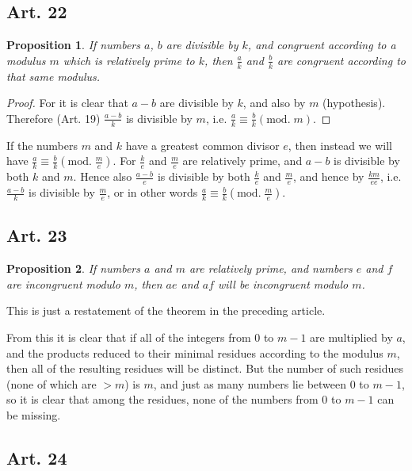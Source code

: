 \documentclass{book}
\theoremstyle{plain}
\newtheorem{proposition}{Proposition}
\theoremstyle{remark}
\begin{document}
\subsection*{Art. 22} 

\begin{proposition} If numbers $a$, $b$ are divisible by $k$, and congruent according to a modulus $m$ which is relatively prime to $k$, then $\frac{a}{k}$ and $\frac{b}{k}$ are congruent according to that same modulus.\end{proposition}
\begin{proof} For it is clear that $a-b$ are divisible by $k$, and also by $m$ (hypothesis).  Therefore (Art. 19) $\frac{a-b}{k}$ is divisible by $m$, i.e. $\frac{a}{k} \equiv \frac{b}{k} (\mathrm{mod.}\; m)$.
\end{proof}

If the numbers $m$ and $k$ have a greatest common divisor $e$, then instead we will have $\frac{a}{k} \equiv \frac{b}{k} (\mathrm{mod.} \; \frac{m}{e})$. For $\frac{k}{e}$ and $\frac{m}{e}$ are relatively prime, and $a-b$ is divisible by both $k$ and $m$.  Hence also $\frac{a-b}{e}$ is divisible by both $\frac{k}{e}$ and $\frac{m}{e}$, and hence by $\frac{km}{ee}$, i.e. $\frac{a-b}{k}$ is divisible by $\frac{m}{e}$, or in other words $\frac{a}{k} \equiv \frac{b}{k} (\mathrm{mod.}\;\frac{m}{e})$.

\subsection*{Art. 23}

\begin{proposition} If numbers $a$ and $m$ are relatively prime, and numbers $e$ and $f$ are incongruent modulo $m$, then $ae$ and $af$ will be incongruent modulo $m$. \end{proposition}

This is just a restatement of the theorem in the preceding article.

From this it is clear that if all of the integers from $0$ to $m-1$ are multiplied by $a$, and the products reduced to their minimal residues according to the modulus $m$, then all of the resulting residues will be distinct.  But the number of such residues (none of which are $>m$) is $m$, and just as many numbers lie between $0$ to $m-1$, so it is clear that among the residues, none of the numbers from $0$ to $m-1$ can be missing.

\subsection*{Art. 24} 
\end{document}
